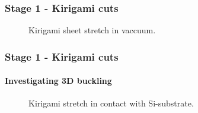 \documentclass[
	10pt, %
]{beamer}
\begin{document}
\begin{frame}
	\frametitle{Stage 1 - Kirigami cuts}


	\begin{figure}
		\centering    
		\caption{Kirigami sheet stretch in vaccuum.}
   \end{figure} 

\end{frame}


\begin{frame}
	\frametitle{Stage 1 - Kirigami cuts}
	\framesubtitle{Investigating 3D buckling}
	
	\begin{figure}
		\centering    
		\caption{Kirigami stretch in contact with Si-substrate.}
	\end{figure} 
	
	
	
\end{frame}
\end{document}
